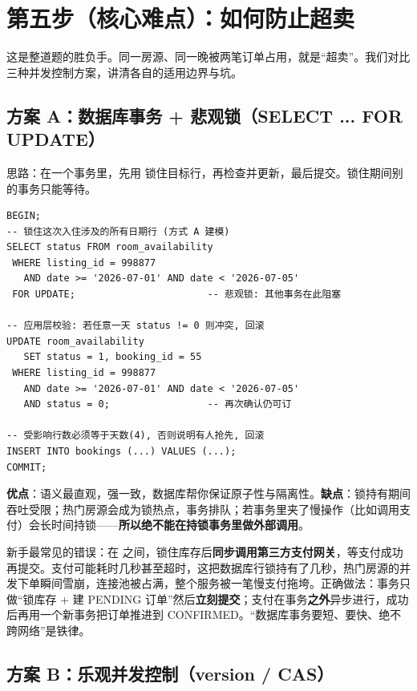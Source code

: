 \section{第五步（核心难点）：如何防止超卖}

这是整道题的胜负手。同一房源、同一晚被两笔订单占用，就是“超卖”。我们对比三种并发控制方案，讲清各自的适用边界与坑。

\subsection{方案 A：数据库事务 + 悲观锁（SELECT ... FOR UPDATE）}

思路：在一个事务里，先用  锁住目标行，再检查并更新，最后提交。锁住期间别的事务只能等待。

\begin{lstlisting}
BEGIN;
-- 锁住这次入住涉及的所有日期行 (方式 A 建模)
SELECT status FROM room_availability
 WHERE listing_id = 998877
   AND date >= '2026-07-01' AND date < '2026-07-05'
 FOR UPDATE;                       -- 悲观锁: 其他事务在此阻塞

-- 应用层校验: 若任意一天 status != 0 则冲突, 回滚
UPDATE room_availability
   SET status = 1, booking_id = 55
 WHERE listing_id = 998877
   AND date >= '2026-07-01' AND date < '2026-07-05'
   AND status = 0;                 -- 再次确认仍可订

-- 受影响行数必须等于天数(4), 否则说明有人抢先, 回滚
INSERT INTO bookings (...) VALUES (...);
COMMIT;
\end{lstlisting}

\textbf{优点}：语义最直观，强一致，数据库帮你保证原子性与隔离性。\textbf{缺点}：锁持有期间吞吐受限；热门房源会成为锁热点，事务排队；若事务里夹了慢操作（比如调用支付）会长时间持锁——\textbf{所以绝不能在持锁事务里做外部调用}。

\begin{pitfall}
新手最常见的错误：在  之间，锁住库存后\textbf{同步调用第三方支付网关}，等支付成功再提交。支付可能耗时几秒甚至超时，这把数据库行锁持有了几秒，热门房源的并发下单瞬间雪崩，连接池被占满，整个服务被一笔慢支付拖垮。正确做法：事务只做“锁库存 + 建 PENDING 订单”然后\textbf{立刻提交}；支付在事务\textbf{之外}异步进行，成功后再用一个新事务把订单推进到 CONFIRMED。“数据库事务要短、要快、绝不跨网络”是铁律。
\end{pitfall}

\subsection{方案 B：乐观并发控制（version / CAS）}

